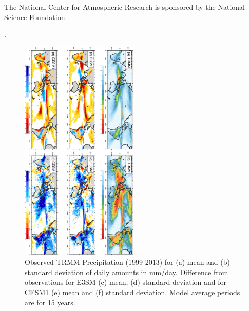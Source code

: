 \documentclass[draft,ms]{AGUTeX}
\begin{document}
\begin{article}
\begin{acknowledgments}
The National Center for Atmospheric Research is sponsored by the National Science Foundation.
\end{acknowledgments}



%
%
%
%
%

.




\begin{figure}[t]
  \begin{center}
    \noindent\includegraphics[width=0.5\textwidth,angle=90.]{./figs/f_mean_var_PRECT_DJF.pdf}
  \end{center}
  \caption{Observed TRMM Precipitation (1999-2013) for (a) mean and (b) standard deviation of daily amounts in mm/day. Difference from observations for E3SM (c) mean, (d) standard deviation and for CESM1 (e) mean and (f) standard deviation. Model average periods are for 15 years.} 
\label{f_mean_var_PRECT_DJF}
\end{figure}


\end{article}
\end{document}
